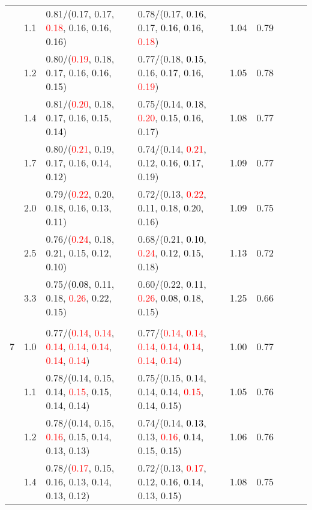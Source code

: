 \documentclass[10pt,a4paper]{report}
\begin{document}
\begin{table}[!htbp]
\begin{center}
{\begin{tabular}{ccllccccc}
			&1.1&0.81/(0.17, 0.17, \textcolor{red}{0.18}, 0.16, 0.16, \textcolor{black}{0.16})&0.78/(0.17, 0.16, 0.17, \textcolor{black}{0.16}, 0.16, \textcolor{red}{0.18})&1.04&0.79\\
			&1.2&0.80/(\textcolor{red}{0.19}, 0.18, 0.17, 0.16, 0.16, \textcolor{black}{0.15})&0.77/(0.18, \textcolor{black}{0.15}, 0.16, 0.17, 0.16, \textcolor{red}{0.19})&1.05&0.78\\
			&1.4&0.81/(\textcolor{red}{0.20}, 0.18, 0.17, 0.16, 0.15, \textcolor{black}{0.14})&0.75/(\textcolor{black}{0.14}, 0.18, \textcolor{red}{0.20}, 0.15, 0.16, 0.17)&1.08&0.77\\
			&1.7&0.80/(\textcolor{red}{0.21}, 0.19, 0.17, 0.16, 0.14, \textcolor{black}{0.12})&0.74/(0.14, \textcolor{red}{0.21}, \textcolor{black}{0.12}, 0.16, 0.17, 0.19)&1.09&0.77\\
			&2.0&0.79/(\textcolor{red}{0.22}, 0.20, 0.18, 0.16, 0.13, \textcolor{black}{0.11})&0.72/(0.13, \textcolor{red}{0.22}, \textcolor{black}{0.11}, 0.18, 0.20, 0.16)&1.09&0.75\\
			&2.5&0.76/(\textcolor{red}{0.24}, 0.18, 0.21, 0.15, 0.12, \textcolor{black}{0.10})&0.68/(0.21, \textcolor{black}{0.10}, \textcolor{red}{0.24}, 0.12, 0.15, 0.18)&1.13&0.72\\
			&3.3&0.75/(\textcolor{black}{0.08}, 0.11, 0.18, \textcolor{red}{0.26}, 0.22, 0.15)&0.60/(0.22, 0.11, \textcolor{red}{0.26}, \textcolor{black}{0.08}, 0.18, 0.15)&1.25&0.66\\
			&&&&\\
			7			&1.0&0.77/(\textcolor{red}{0.14}, \textcolor{red}{0.14}, \textcolor{red}{0.14}, \textcolor{red}{0.14}, \textcolor{red}{0.14}, \textcolor{red}{0.14}, \textcolor{red}{0.14})&0.77/(\textcolor{red}{0.14}, \textcolor{red}{0.14}, \textcolor{red}{0.14}, \textcolor{red}{0.14}, \textcolor{red}{0.14}, \textcolor{red}{0.14}, \textcolor{red}{0.14})&1.00&0.77\\
			&1.1&0.78/(0.14, 0.15, 0.14, \textcolor{red}{0.15}, 0.15, 0.14, \textcolor{black}{0.14})&0.75/(0.15, 0.14, 0.14, 0.14, \textcolor{red}{0.15}, \textcolor{black}{0.14}, 0.15)&1.05&0.76\\
			&1.2&0.78/(0.14, 0.15, \textcolor{red}{0.16}, 0.15, 0.14, 0.13, \textcolor{black}{0.13})&0.74/(0.14, \textcolor{black}{0.13}, 0.13, \textcolor{red}{0.16}, 0.14, 0.15, 0.15)&1.06&0.76\\
			&1.4&0.78/(\textcolor{red}{0.17}, 0.15, 0.16, 0.13, 0.14, 0.13, \textcolor{black}{0.12})&0.72/(0.13, \textcolor{red}{0.17}, \textcolor{black}{0.12}, 0.16, 0.14, 0.13, 0.15)&1.08&0.75\\

\end{tabular}}
\end{center}
\end{table}
\end{document}
